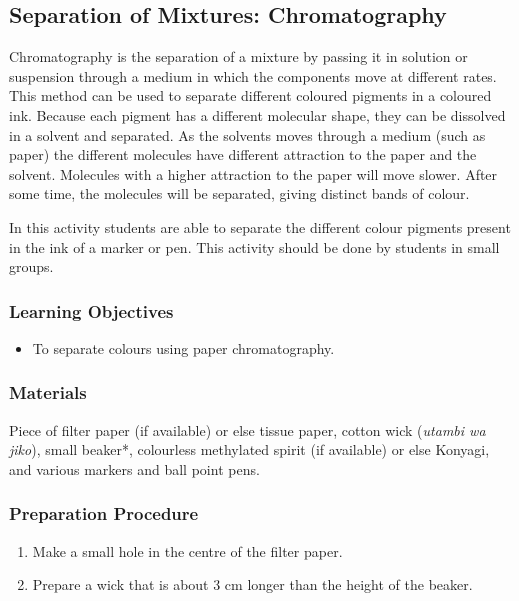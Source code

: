 \subsection{Separation of Mixtures: Chromatography}
Chromatography is the separation of a mixture by passing it in solution or suspension through a medium in which the components move at different rates. This method can be used to separate different coloured pigments in a coloured ink. Because each pigment has a different molecular shape, they can be dissolved in a solvent and separated. As the solvents moves through a medium (such as paper) the different molecules have different attraction to the paper and the solvent. Molecules with a higher attraction to the paper will move slower. After some time, the molecules will be separated, giving distinct bands of colour.

In this activity students are able to separate the different colour pigments present in the ink of a marker or pen. This activity should be done by students in small groups.
\subsubsection*{Learning Objectives}
\begin{itemize}

\item{To separate colours using paper chromatography.}

\end{itemize}

\subsubsection*{Materials}
Piece of filter paper (if available) or else tissue paper, cotton wick (\textit{utambi wa jiko}), small beaker*, colourless methylated spirit (if available) or else Konyagi, and various markers and ball point pens.

\subsubsection*{Preparation Procedure}
\begin{enumerate}
\item{Make a small hole in the centre of the filter paper.}
\item{Prepare a wick that is about 3 cm longer than the height of the beaker.}
\end{enumerate}

